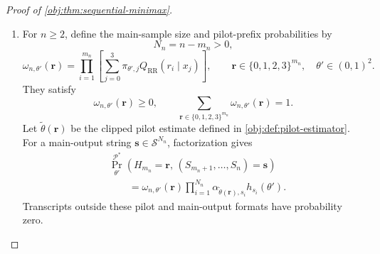 \documentclass[11pt]{article}
\begin{document}
\begin{proof}[Proof of \cref{obj:thm:sequential-minimax}]
\begin{enumerate}
Channel normalization and the affine dependence of the pattern masses give
\[
\sum_S\alpha_{\eta,S}h_S(\theta')=1,
\qquad
\sum_S\alpha_{\eta,S}g_S=0,
\qquad
h_S(\theta')=h_S(\eta)+g_S^\top(\theta'-\eta).
\]
Therefore
\[
\begin{aligned}
\sum_S\alpha_{\eta,S}h_S(\theta')\phi_\eta(S)
&=
\frac1{J_\eta}
\left[
\sum_S\alpha_{\eta,S}g_S^\top v_\eta
+
(\theta'-\eta)^\top\mathcal I_\eta v_\eta
\right]\\
&=
c^\top(\theta'-\eta)
=
\tau(\theta')-\tau(\eta).
\end{aligned}
\]
At the diagonal,
\[
\begin{aligned}
\sum_S\alpha_{\eta,S}h_S(\eta)\phi_\eta(S)^2
&=
\frac1{J_\eta^2}
\sum_S
\alpha_{\eta,S}\frac{(g_S^\top v_\eta)^2}{h_S(\eta)}\\
&=\frac1{J_\eta}=V^*(\eta,p,\varepsilon).
\end{aligned}
\]
Consequently,
\[
\sigma^2(\theta',\eta)
=
\sum_S\alpha_{\eta,S}h_S(\theta')
\left[
\phi_\eta(S)-\bigl(\tau(\theta')-\tau(\eta)\bigr)
\right]^2,
\]
and
\[
0\le\sigma^2(\theta',\eta)\le C_\phi^2,
\qquad
\sigma^2(\eta,\eta)=V^*(\eta,p,\varepsilon).
\]
The upper bound follows by bounding the uncentered second moment by \(C_\phi^2\) and subtracting the squared mean.

\item
For \(n\ge2\), define the main-sample size and pilot-prefix probabilities by
\[
N_n=n-m_n>0,
\]
\[
\omega_{n,\theta'}(\mathbf r)
=
\prod_{i=1}^{m_n}
\left[
\sum_{j=0}^3
\pi_{\theta',j}Q_{\mathrm{RR}}(r_i\mid x_j)
\right],
\qquad
\mathbf r\in\{0,1,2,3\}^{m_n},
\quad \theta'\in(0,1)^2.
\]
They satisfy
\[
\omega_{n,\theta'}(\mathbf r)\ge0,
\qquad
\sum_{\mathbf r\in\{0,1,2,3\}^{m_n}}
\omega_{n,\theta'}(\mathbf r)=1.
\]
Let \(\widetilde\theta(\mathbf r)\) be the clipped pilot estimate defined in \cref{obj:def:pilot-estimator}. For a main-output string
\(\mathbf s\in\mathcal S^{N_n}\), factorization gives
\[
\begin{aligned}
&\Pr_{\theta'}^{\mathcal P^*}
\!\left(H_{m_n}=\mathbf r,\,
(S_{m_n+1},\ldots,S_n)=\mathbf s\right)\\
&\qquad=
\omega_{n,\theta'}(\mathbf r)
\prod_{i=1}^{N_n}
\alpha_{\widetilde\theta(\mathbf r),s_i}
h_{s_i}(\theta').
\end{aligned}
\]
Transcripts outside these pilot and main-output formats have probability zero.


\end{enumerate}
\end{proof}
\end{document}

